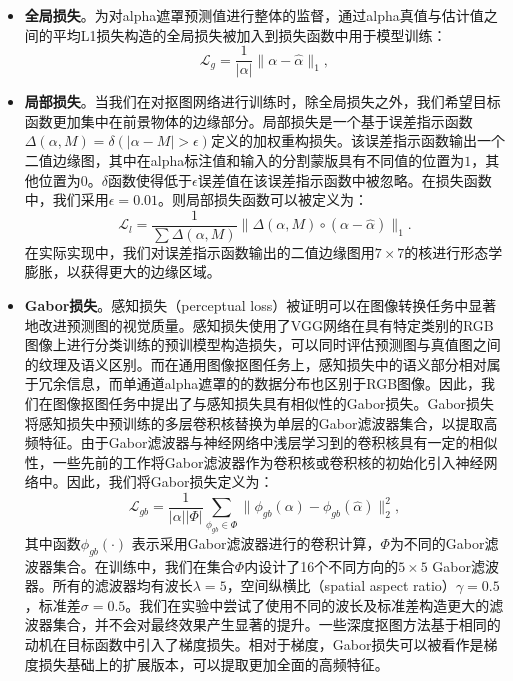 \begin{itemize}
	\item \textbf{全局损失}。为对alpha遮罩预测值进行整体的监督，通过alpha真值与估计值之间的平均L1损失构造的全局损失被加入到损失函数中用于模型训练：
	\begin{equation}
	\mathcal{L}_g = \frac{1}{|\alpha|}\|\alpha-\hat{\alpha}\|_1, 
	\end{equation}

	\item \textbf{局部损失}。当我们在对抠图网络进行训练时，除全局损失之外，我们希望目标函数更加集中在前景物体的边缘部分。局部损失是一个基于误差指示函数$ \Delta(\alpha, M) = \delta(|\alpha - M|>\epsilon) $定义的加权重构损失。该误差指示函数输出一个二值边缘图，其中在alpha标注值和输入的分割蒙版具有不同值的位置为$1$，其他位置为$0$。$ \delta $函数使得低于$ \epsilon $误差值在该误差指示函数中被忽略。在损失函数中，我们采用$ \epsilon=0.01 $。则局部损失函数可以被定义为： 
	\begin{equation}
	\mathcal{L}_l = \frac{1}{\sum \Delta(\alpha, M)}\|\Delta(\alpha, M) \circ (\alpha-\hat{\alpha})\|_1.
	\end{equation}
	在实际实现中，我们对误差指示函数输出的二值边缘图用$ 7\times 7 $的核进行形态学膨胀，以获得更大的边缘区域。

	\item \textbf{Gabor损失}。感知损失（perceptual loss）\cite{johnson2016perceptual}被证明可以在图像转换任务中显著地改进预测图的视觉质量。感知损失使用了VGG网络\cite{simonyan2014very}在具有特定类别的RGB图像上进行分类训练的预训模型构造损失，可以同时评估预测图与真值图之间的纹理及语义区别。而在通用图像抠图任务上，感知损失中的语义部分相对属于冗余信息，而单通道alpha遮罩的的数据分布也区别于RGB图像。因此，我们在图像抠图任务中提出了与感知损失具有相似性的Gabor损失。Gabor损失将感知损失中预训练的多层卷积核替换为单层的Gabor滤波器集合，以提取高频特征。由于Gabor滤波器与神经网络中浅层学习到的卷积核具有一定的相似性，一些先前的工作\cite{ouyang2013joint}将Gabor滤波器作为卷积核或卷积核的初始化引入神经网络中。因此，我们将Gabor损失定义为：
	\begin{equation}
	\mathcal{L}_{gb} = \frac{1}{|\alpha||\Phi|}\sum_{\phi_{gb}\in \Phi}\|\phi_{gb}(\alpha)-\phi_{gb}(\hat{\alpha})\|_2^2,
	\end{equation}
	其中函数$ \phi_{gb}(\cdot)$ 表示采用Gabor滤波器进行的卷积计算，$ \Phi $为不同的Gabor滤波器集合。在训练中，我们在集合$ \Phi $内设计了16个不同方向的$5\times5$ Gabor滤波器。所有的滤波器均有波长$\lambda=5$，空间纵横比（spatial aspect ratio）$\gamma=0.5$，标准差$\sigma=0.5$。我们在实验中尝试了使用不同的波长及标准差构造更大的滤波器集合，并不会对最终效果产生显著的提升。一些深度抠图方法基于相同的动机在目标函数中引入了梯度损失\cite{levinshtein2018real,chen2019boundary,samplenet}。相对于梯度，Gabor损失可以被看作是梯度损失基础上的扩展版本，可以提取更加全面的高频特征。
\end{itemize}


